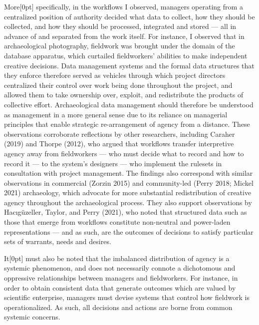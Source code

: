 \documentclass[
]{article}
\newcommand{\paragraphnumber}[1]{\marginnote{\color{lightgray}\tiny{#1}}[0pt]}
\begin{document}
More\paragraphnumber{[79]} specifically, in the workflows I observed,
managers operating from a centralized position of authority decided what
data to collect, how they should be collected, and how they should be
processed, integrated and stored --- all in advance of and separated
from the work itself. For instance, I observed that in archaeological
photography, fieldwork was brought under the domain of the database
apparatus, which curtailed fieldworkers' abilities to make independent
creative decisions. Data management systems and the formal data
structures that they enforce therefore served as vehicles through which
project directors centralized their control over work being done
throughout the project, and allowed them to take ownership over,
exploit, and redistribute the products of collective effort.
Archaeological data management should therefore be understood as
management in a more general sense due to its reliance on managerial
principles that enable strategic re-arrangement of agency from a
distance. These observations corroborate reflections by other
researchers, including Caraher (2019) and Thorpe (2012), who argued that
workflows transfer interpretive agency away from fieldworkers --- who
must decide what to record and how to record it --- to the system's
designers --- who implement the rulesets in consultation with project
management. The findings also correspond with similar observations in
commercial (Zorzin 2015) and community-led (Perry 2018; Mickel 2021)
archaeology, which advocate for more substantial redistribution of
creative agency throughout the archaeological process. They also support
observations by Hacıgüzeller, Taylor, and Perry (2021), who noted that
structured data such as those that emerge from workflows constitute
non-neutral and power-laden representations --- and as such, are the
outcomes of decisions to satisfy particular sets of warrants, needs and
desires.

It\paragraphnumber{[80]} must also be noted that the imbalanced
distribution of agency is a systemic phenomenon, and does not
necessarily connote a dichotomous and oppressive relationships between
managers and fieldworkers. For instance, in order to obtain consistent
data that generate outcomes which are valued by scientific enterprise,
managers must devise systems that control how fieldwork is
operationalized. As such, all decisions and actions are borne from
common systemic concerns.
\end{document}
